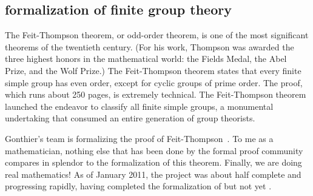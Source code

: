 \documentclass{llncs}
\begin{document}
\subsection{formalization of finite group theory}



The Feit-Thompson theorem, or odd-order theorem, is one of the most
significant theorems of the twentieth century.  (For his work,
Thompson was awarded the three highest honors in
the mathematical world: the Fields Medal, the Abel Prize, and the Wolf
Prize.)  The Feit-Thompson theorem states that every finite simple
group has even order, except for cyclic groups of prime order.  The
proof, which runs about 250 pages, is extremely technical.  The
Feit-Thompson theorem launched the endeavor to classify all finite
simple groups, a monumental undertaking that consumed an entire
generation of group theorists.



Gonthier's team is formalizing the proof of Feit-Thompson~\cite{gonMF}.
To me as a mathematician, nothing else that has been done by the formal
proof community compares in splendor to the formalization of this
theorem.  Finally, we are doing real mathematics!  As of January 2011,
the project was about half complete and progressing rapidly, having
completed the formalization of \cite{BG94} but not yet \cite{P00}.
\end{document}
